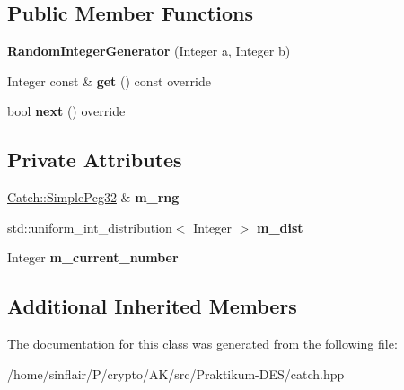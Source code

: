 \subsection*{Public Member Functions}
\begin{DoxyCompactItemize}
\item 
\mbox{\label{classCatch_1_1Generators_1_1RandomIntegerGenerator_a886d16c899ad70781b83a0e8f9d2cf96}} 
{\bfseries Random\+Integer\+Generator} (Integer a, Integer b)
\item 
\mbox{\label{classCatch_1_1Generators_1_1RandomIntegerGenerator_aafbdf9028762f5e8f8ca9c317d686fca}} 
Integer const  \& {\bfseries get} () const override
\item 
\mbox{\label{classCatch_1_1Generators_1_1RandomIntegerGenerator_aaa3db70fbdfa3e8dcb61fb5592eba81f}} 
bool {\bfseries next} () override
\end{DoxyCompactItemize}
\subsection*{Private Attributes}
\begin{DoxyCompactItemize}
\item 
\mbox{\label{classCatch_1_1Generators_1_1RandomIntegerGenerator_af561ef07b93877d15a9af5e5fe19ea13}} 
\hyperlink{classCatch_1_1SimplePcg32}{Catch\+::\+Simple\+Pcg32} \& {\bfseries m\+\_\+rng}
\item 
\mbox{\label{classCatch_1_1Generators_1_1RandomIntegerGenerator_a0f9a8e409e291c332ebba1667cdc90fe}} 
std\+::uniform\+\_\+int\+\_\+distribution$<$ Integer $>$ {\bfseries m\+\_\+dist}
\item 
\mbox{\label{classCatch_1_1Generators_1_1RandomIntegerGenerator_a1b811ebf04416b6b822ce153b040f020}} 
Integer {\bfseries m\+\_\+current\+\_\+number}
\end{DoxyCompactItemize}
\subsection*{Additional Inherited Members}


The documentation for this class was generated from the following file\+:\begin{DoxyCompactItemize}
\item 
/home/sinflair/\+P/crypto/\+A\+K/src/\+Praktikum-\/\+D\+E\+S/catch.\+hpp\end{DoxyCompactItemize}
